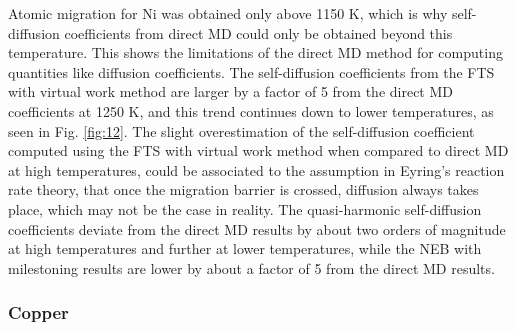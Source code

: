\documentclass{article}
\begin{document}
Atomic migration for Ni was obtained only above 1150 K, which is why self-diffusion coefficients from direct MD could only be obtained beyond this temperature. This shows the limitations of the direct MD method for computing quantities like diffusion coefficients. The self-diffusion coefficients from the FTS with virtual work method are larger by a factor of 5 from the direct MD coefficients at 1250 K, and this trend continues down to lower temperatures, as seen in Fig. \ref{fig:12}. The slight overestimation of the self-diffusion coefficient computed using the FTS with virtual work method when compared to direct MD at high temperatures, could be associated to the assumption in Eyring's reaction rate theory, that once the migration barrier is crossed, diffusion always takes place, which may not be the case in reality. The quasi-harmonic self-diffusion coefficients deviate from the direct MD results by about two orders of magnitude at high temperatures and further at lower temperatures, while the NEB with milestoning results are lower by about a factor of 5 from the direct MD results.

\subsubsection{Copper}
\end{document}
